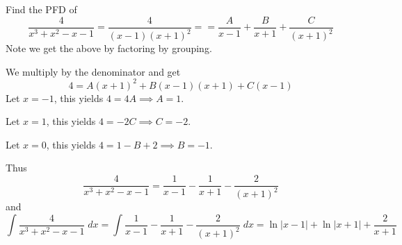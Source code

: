 \documentclass{article}
\begin{document}
\begin{example}
  Find the PFD of \[
    \frac{4}{x^3 + x^2 -x -1} = \frac{4}{(x-1)(x+1)^2} = = \frac{A}{x-1} + \frac{B}{x+1} + \frac{C}{(x+1)^2}
  \]
  Note we get the above by factoring by grouping.

  We multiply by the denominator and get \[
    4 = A(x+1)^2 + B(x-1)(x+1) + C(x-1)
  \]
  Let $x = -1$, this yields $4= 4A \implies A = 1$.

  Let $x = 1$, this yields $4= -2C \implies C = -2$.

  Let $x = 0$, this yields $4 = 1 - B + 2 \implies B = -1$.

  Thus \[
    \frac{4}{x^3 + x^2 -x -1} = \frac{1}{x-1} - \frac{1}{x+1} - \frac{2}{(x+1)^2}
  \] and \[
    \int \frac{4}{x^3 + x^2 -x -1} \; dx = \int \frac{1}{x-1} - \frac{1}{x+1} - \frac{2}{(x+1)^2} \; dx= \ln |x-1| + \ln|x+1| + \frac{2}{x+1}
  \]
\end{example}
\end{document}
